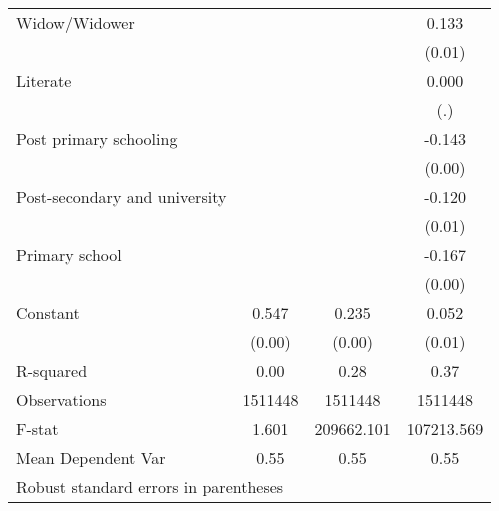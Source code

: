 {\begin{tabular}{l*{3}{c}}
Widow/Widower       &                     &                     &       0.133\sym{***}\\
                    &                     &                     &      (0.01)         \\
Literate            &                     &                     &       0.000         \\
                    &                     &                     &         (.)         \\
Post primary schooling&                     &                     &      -0.143\sym{***}\\
                    &                     &                     &      (0.00)         \\
Post-secondary and university&                     &                     &      -0.120\sym{***}\\
                    &                     &                     &      (0.01)         \\
Primary school      &                     &                     &      -0.167\sym{***}\\
                    &                     &                     &      (0.00)         \\
Constant            &       0.547\sym{***}&       0.235\sym{***}&       0.052\sym{***}\\
                    &      (0.00)         &      (0.00)         &      (0.01)         \\
\hline
R-squared           &        0.00         &        0.28         &        0.37         \\
Observations        &     1511448         &     1511448         &     1511448         \\
F-stat              &       1.601         &  209662.101         &  107213.569         \\
Mean Dependent Var  &        0.55         &        0.55         &        0.55         \\
\hline\hline
\multicolumn{4}{l}{\footnotesize Robust standard errors in parentheses}\\
\end{tabular}
}
